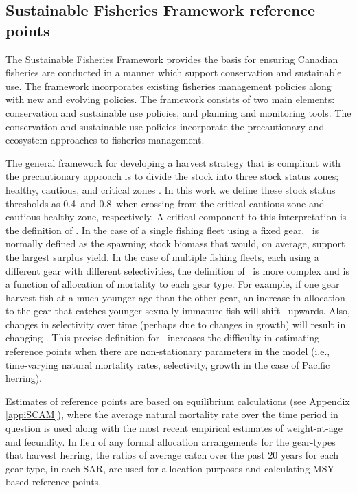 	\subsection{Sustainable Fisheries Framework reference points}

The Sustainable Fisheries Framework provides the basis for ensuring Canadian fisheries are conducted in a manner which support conservation and sustainable use. The framework incorporates existing fisheries management policies along with new and evolving policies.  The framework consists of two main elements: conservation and sustainable use policies, and planning and monitoring tools.  The conservation and sustainable use policies incorporate the precautionary and ecosystem approaches to fisheries management. 


The general framework for developing a harvest strategy that is compliant with the precautionary approach is to divide the stock into three stock status zones; healthy, cautious, and critical zones \citep{dfo2006}.  In this work we define these stock status thresholds as 0.4\bmsy\ and 0.8\bmsy\ when crossing from the critical-cautious zone and cautious-healthy zone, respectively.  A critical component to this interpretation is the definition of \bmsy.  In the case of a single fishing fleet using a fixed gear, \bmsy\ is normally defined as the spawning stock biomass that would, on average, support the largest surplus yield.  In the case of multiple fishing fleets, each using a different gear with different selectivities, the definition of \bmsy\ is more complex and is a function of allocation of mortality to each gear type.  For example, if one gear harvest fish at a much younger age than the other gear, an increase in allocation to the gear that catches younger sexually immature fish will shift \bmsy\ upwards. Also, changes in selectivity over time (perhaps due to changes in growth) will result in changing \bmsy.  This precise definition for \bmsy\ increases the difficulty in estimating reference points when there are non-stationary parameters in the model (i.e., time-varying natural mortality rates, selectivity, growth in the case of Pacific herring).
	
	Estimates of reference points are based on equilibrium calculations (see Appendix \ref{appiSCAM}), where the average natural mortality rate over the time period in question is used along with the most recent empirical estimates of weight-at-age and fecundity.  In lieu of any formal allocation arrangements for the gear-types that harvest herring, the ratios of average catch over the past 20 years for each gear type, in each SAR, are used for allocation purposes and calculating MSY based reference points. 
	
